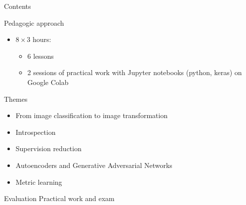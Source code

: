 \documentclass[xcolor=pdftex,dvipsnames,table,mathserif]{beamer}
\begin{document}
\begin{frame}{Contents}


\begin{block}{Pedagogic approach}

  \begin{itemize}
  \item $8 \times 3$ hours:
    \begin{itemize}
    \item 6 lessons
    \item 2 sessions of practical work with Jupyter notebooks (python, keras) on Google Colab
    \end{itemize}
  \end{itemize}
\end{block}

\begin{block}{Themes}
\begin{itemize}
\item From image classification to image transformation
\item Introspection
\item Supervision reduction
\item Autoencoders and Generative Adversarial Networks
\item Metric learning
\end{itemize}
\end{block}

  \begin{block}{Evaluation}
  Practical work and exam
  \end{block}

\end{frame}


\end{document}
